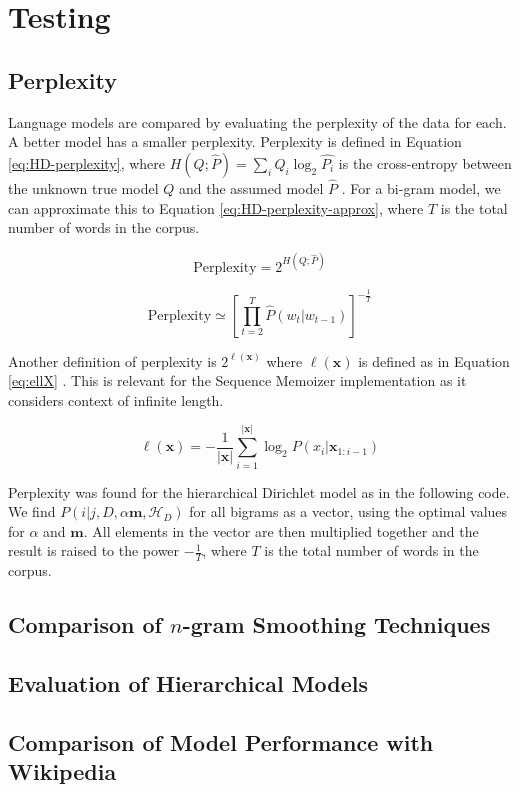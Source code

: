 \chapter{Testing}\label{chap:results}

\section{Perplexity}\label{sec:perplexity}

Language models are compared by evaluating the perplexity of the data for each. A better model has a smaller perplexity. Perplexity is defined in Equation \ref{eq:HD-perplexity}, where $H(Q;\hat{P})=\sum_{i}Q_{i}\log_{2}\hat{P_{i}}$ is the cross-entropy between the unknown true model $Q$ and the assumed model $\hat{P}$ \cite{mackay1995hierarchical}. For a bi-gram model, we can approximate this to Equation \ref{eq:HD-perplexity-approx}, where $T$ is the total number of words in the corpus.

\begin{equation}
\text{Perplexity}=2^{H(Q;\hat{P})}
\label{eq:HD-perplexity}
\end{equation}

\begin{equation}
\text{Perplexity}\simeq\left[\prod_{t=2}^{T}\hat{P}(w_{t}|w_{t-1})\right]^{-\frac{1}{T}}
\label{eq:HD-perplexity-approx}
\end{equation}

Another definition of perplexity is $2^{\ell(\boldsymbol{x})}$ where $\ell(\boldsymbol{x})$ is defined as in Equation \ref{eq:ellX} \cite{wood2011sequence}. This is relevant for the Sequence Memoizer implementation as it considers context of infinite length.

\begin{equation}
\ell(\boldsymbol{x})=-\frac{1}{|\boldsymbol{x}|}\sum_{i=1}^{|\boldsymbol{x}|}\log_{2}P(x_{i}|\boldsymbol{x}_{1:i-1})
\label{eq:ellX}
\end{equation}

Perplexity was found for the hierarchical Dirichlet model as in the following code. We find $P(i|j,D,\alpha\boldsymbol{m},\mathscr{H}_{D})$ for all bigrams as a vector, using the optimal values for $\alpha$ and $\boldsymbol{m}$. All elements in the vector are then multiplied together and the result is raised to the power $-\frac{1}{T}$, where $T$ is the total number of words in the corpus.



\section{Comparison of $n$-gram Smoothing Techniques}


\section{Evaluation of Hierarchical Models}


\section{Comparison of Model Performance with Wikipedia}

